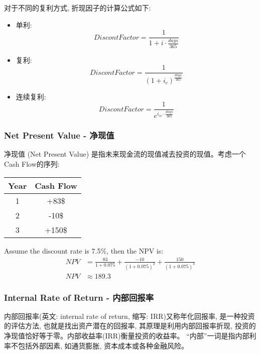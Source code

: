 对于不同的复利方式, 折现因子的计算公式如下:
\begin{itemize}
    \item 单利:
          \begin{equation}
              Discont Factor = \frac{1}{1 + i \cdot \frac{days}{365}}
          \end{equation}
    \item 复利:
          \begin{equation}
              Discont Factor = \frac{1}{(1 + i_{c})^{\frac{days}{365}}}
          \end{equation}
    \item 连续复利:
          \begin{equation}
              Discont Factor = \frac{1}{e^{i_{cc} \cdot \frac{days}{365}}}
          \end{equation}
\end{itemize}

\subsubsection{Net Present Value - 净现值}
净现值 (Net Present Value) 是指未来现金流的现值减去投资的现值。考虑一个Cash Flow的序列:
\begin{table}[H]
    \centering
    \begin{tabular}{|c|c|}
        \hline
        Year & Cash Flow \\
        \hline
        1   & +83\$ \\
        \hline
        2   & -10\$ \\
        \hline
        3   & +150\$ \\
        \hline
    \end{tabular}
\end{table}
Assume the discount rate is 7.5\%, then the NPV is:
\begin{equation}
    \begin{aligned}
        NPV & = \frac{83}{1 + 0.075} + \frac{-10}{(1 + 0.075)^2} + \frac{150}{(1 + 0.075)^3} \\
        NPV & \approx 189.3
    \end{aligned}
\end{equation}

\subsubsection{Internal Rate of Return - 内部回报率}
内部回报率(英文: internal rate of return, 缩写: IRR)又称年化回报率, 是一种投资的评估方法, 也就是找出资产潜在的回报率, 其原理是利用内部回报率折现, 投资的净现值恰好等于零。内部收益率(IRR)衡量投资的收益率。 “内部”一词是指内部利率不包括外部因素, 如通货膨胀, 资本成本或各种金融风险。

